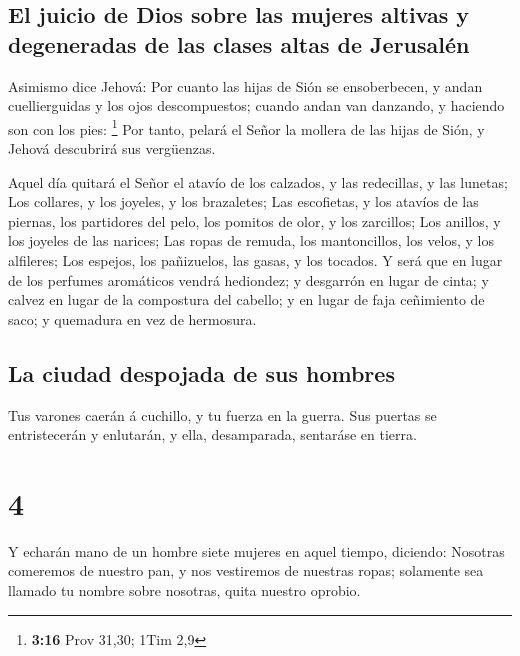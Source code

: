 \hypertarget{el-juicio-de-dios-sobre-las-mujeres-altivas-y-degeneradas-de-las-clases-altas-de-jerusaluxe9n}{%
\subsection{El juicio de Dios sobre las mujeres altivas y degeneradas de
las clases altas de
Jerusalén}\label{el-juicio-de-dios-sobre-las-mujeres-altivas-y-degeneradas-de-las-clases-altas-de-jerusaluxe9n}}

 Asimismo dice Jehová: Por cuanto las hijas de Sión se
ensoberbecen, y andan cuellierguidas y los ojos descompuestos; cuando
andan van danzando, y haciendo son con los pies: \footnote{\textbf{3:16}
  Prov 31,30; 1Tim 2,9}  Por tanto, pelará el Señor la
mollera de las hijas de Sión, y Jehová descubrirá sus vergüenzas.

 Aquel día quitará el Señor el atavío de los calzados, y
las redecillas, y las lunetas;  Los collares, y los
joyeles, y los brazaletes;  Las escofietas, y los atavíos
de las piernas, los partidores del pelo, los pomitos de olor, y los
zarcillos;  Los anillos, y los joyeles de las narices;
 Las ropas de remuda, los mantoncillos, los velos, y los
alfileres;  Los espejos, los pañizuelos, las gasas, y los
tocados.  Y será que en lugar de los perfumes aromáticos
vendrá hediondez; y desgarrón en lugar de cinta; y calvez en lugar de la
compostura del cabello; y en lugar de faja ceñimiento de saco; y
quemadura en vez de hermosura.

\hypertarget{la-ciudad-despojada-de-sus-hombres}{%
\subsection{La ciudad despojada de sus
hombres}\label{la-ciudad-despojada-de-sus-hombres}}

 Tus varones caerán á cuchillo, y tu fuerza en la guerra.
 Sus puertas se entristecerán y enlutarán, y ella,
desamparada, sentaráse en tierra.

\hypertarget{section-3}{%
\section{4}\label{section-3}}

 Y echarán mano de un hombre siete mujeres en aquel
tiempo, diciendo: Nosotras comeremos de nuestro pan, y nos vestiremos de
nuestras ropas; solamente sea llamado tu nombre sobre nosotras, quita
nuestro oprobio.

